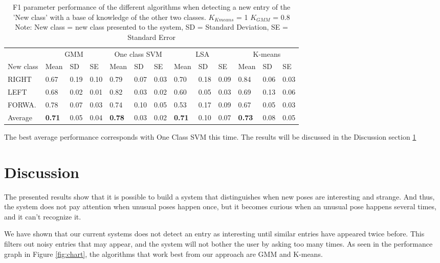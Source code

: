 \begin{table}[!ht]
	\footnotesize
	\renewcommand{\arraystretch}{2}
	\begin{tabular}{p{1.2cm}p{0.7cm}p{0.6cm}p{0.7cm}p{0.7cm}p{0.6cm}p{0.7cm}p{0.7cm}p{0.6cm}p{0.7cm}p{0.7cm}p{0.6cm}p{0.7cm}}
	\hline 
	 & \multicolumn{3}{c}{GMM}& \multicolumn{3}{c}{One class SVM}& \multicolumn{3}{c}{LSA}& \multicolumn{3}{c}{K-means} \\
	New class  & Mean & SD & SE& Mean & SD & SE& Mean & SD & SE& Mean & SD & SE \\
	\hline
	RIGHT  & 0.67 & 0.19 & 0.10 & 0.79 & 0.07 & 0.03 & 0.70 & 0.18 & 0.09 & 0.84 & 0.06 & 0.03      \\
	LEFT  & 0.68 & 0.02 & 0.01 & 0.82 & 0.03 & 0.02 & 0.60 & 0.05 & 0.03 & 0.69 & 0.13 & 0.06    \\
	FORWA.  & 0.78 & 0.07 & 0.03 & 0.74 & 0.10 & 0.05 & 0.53 & 0.17 & 0.09 & 0.67 & 0.05 & 0.03    \\
	Average & \textbf{0.71} & 0.05 & 0.04 & \textbf{0.78} & 0.03 & 0.02 & \textbf{0.71} & 0.10 & 0.07 & \textbf{0.73} & 0.08 & 0.05  \\ 
	\hline
	\end{tabular}
	\centering
	\caption[Novelty Detection F score performance for multi-class novelty detection]{F1 parameter performance of the different algorithms when detecting a new entry of the 'New class' with a base of knowledge of the other two classes. $ K_{Kmeans} $ = 1 $ K_{GMM} $ = 0.8  Note: New class = new class presented to the system, SD = Standard Deviation, SE = Standard Error}
\end{table}

The best average performance corresponds with One Class SVM this time. The results will be discussed in the Discussion section \ref{discussion}


\section{Discussion} \label{discussion}

The presented results show that it is possible to build a system that distinguishes when new poses are interesting and strange. And thus, the system does not pay attention when unusual poses happen once, but it becomes curious when an unusual pose happens several times, and it can't recognize it. 

We have shown that our current systems does not detect an entry as interesting until similar entries have appeared twice before. This filters out noisy entries that may appear, and the system will not bother the user by asking too many times. As seen in the performance graph in Figure \ref{fig:chart}, the algorithms that work best from our approach are GMM and K-means.

